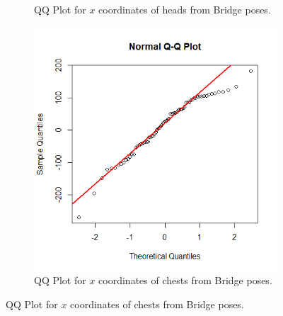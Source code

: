 \documentclass{article}
\begin{document}
\begin{figure}[h!]
\begin{subfigure}[b]{0.4\linewidth}
        \caption{QQ Plot for $x$ coordinates of heads from Bridge poses.}
        \label{fig: bridge head}
    \end{subfigure}
    \hspace{1cm}
    \begin{subfigure}[b]{0.4\linewidth}
        \includegraphics[width=\linewidth]{limb-distribution/bridge_qq_chest_x.png}
        \caption{QQ Plot for $x$ coordinates of chests from Bridge poses.}
        \label{fig: bridge chest}
    \end{subfigure}
\end{figure}

\newpage
\end{document}
